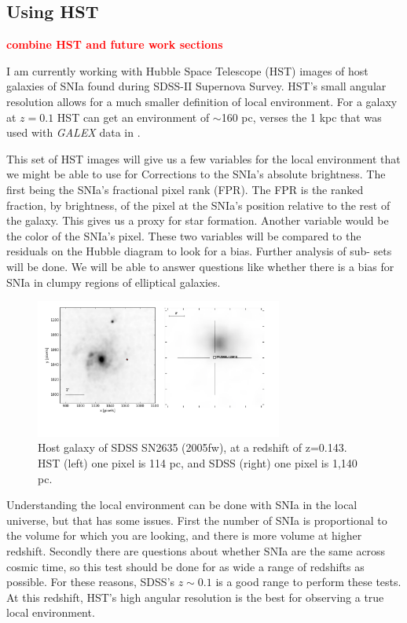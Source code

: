 \documentclass[apj, iop]{emulateapj}
\newcommand{\sn}{SNIa}
\newcommand{\todo}[1]{\textbf{\textcolor{red}{#1}}}
\begin{document}
\subsection{Using HST}\label{using-hst}

\todo{combine HST and future work sections}

I am currently working with Hubble Space Telescope (HST) images of host galaxies
of \sn{} found during SDSS-II Supernova Survey. HST's small angular resolution
allows for a much smaller definition of local environment. For a galaxy at $z =
0.1$ HST can get an environment of $\sim$160 pc, verses the 1 kpc that was used 
with {\it GALEX} data in \cite{Jones15,Rigault15}.

This set of HST images will give us a few variables for the local environment
that we might be able to use for Corrections to the SNIa's absolute brightness.
The first being the SNIa's fractional pixel rank (FPR). The FPR is the ranked
fraction, by brightness, of the pixel at the SNIa's position relative to the
rest of the galaxy. This gives us a proxy for star formation. Another variable
would be the color of the SNIa's pixel. These two variables will be compared to
the residuals on the Hubble diagram to look for a bias. Further analysis of sub-
sets will be done. We will be able to answer questions like whether there is a
bias for \sn{} in clumpy regions of elliptical galaxies.

\begin{figure}
	\includegraphics[width=3.2in]{SN2635-combined-inverted.pdf}
	\caption{Host galaxy of SDSS SN2635 (2005fw), at a redshift of z=0.143. HST 
	(left) one pixel is 114 pc, and SDSS (right) one pixel is 1,140 pc.}
	\label{f:galaxy-compare}
\end{figure}

Understanding the local environment can be done with \sn{} in the local universe,
but that has some issues. First the number of \sn{} is proportional to the volume
for which you are looking, and there is more volume at higher redshift. Secondly
there are questions about whether \sn{} are the same across cosmic time, so this
test should be done for as wide a range of redshifts as possible. For these
reasons, SDSS's $z \sim 0.1$ is a good range to perform these tests. At this
redshift, HST's high angular resolution is the best for observing a true local
environment.
\end{document}
